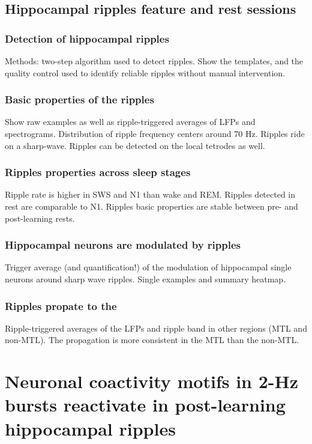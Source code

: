 \documentclass[12pt,a4paper]{report}
\newcommand{\gs}[1]{\glsentryshort{#1}}  %
\begin{document}
\subsection{Hippocampal ripples feature \gs{sws} and rest sessions}
\subsubsection{Detection of hippocampal ripples}
Methods: two-step algorithm used to detect ripples. Show the templates, and the quality control used to identify reliable ripples without manual intervention.

\subsubsection{Basic properties of the ripples}
Show raw examples as well as ripple-triggered averages of LFPs and spectrograms. Distribution of ripple frequency centers around 70 Hz. Ripples ride on a sharp-wave. Ripples can be detected on the local tetrodes as well.

\subsubsection{Ripples properties across sleep stages}
Ripple rate is higher in SWS and N1 than wake and REM. Ripples detected in rest are comparable to N1. Ripples basic properties are stable between pre- and post-learning rests.

\subsubsection{Hippocampal neurons are modulated by ripples}
Trigger average (and quantification!) of the modulation of hippocampal single neurons around sharp wave ripples. Single examples and summary heatmap. 

\subsubsection{Ripples propate to the \gs{mtl}}
Ripple-triggered averages of the LFPs and ripple band in other regions (MTL and non-MTL). The propagation is more consistent in the MTL than the non-MTL. 

\section{Neuronal coactivity motifs in 2-Hz bursts reactivate in post-learning hippocampal ripples}
\end{document}
